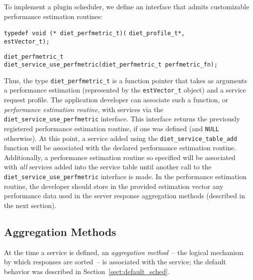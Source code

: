 To implement a plugin scheduler, we define an interface that admits
customizable performance estimation routines:
\begin{tabbing}
  \texttt{typedef void (* diet\_perfmetric\_t)(}
    \=\texttt{diet\_profile\_t*,} \\
    \>\texttt{estVector\_t);} \\
\end{tabbing}
\begin{tabbing}
  \texttt{diet\_perfmetric\_t} \\
  \texttt{diet\_service\_use\_perfmetric(diet\_perfmetric\_t perfmetric\_fn);}\\
\end{tabbing}
Thus, the type \texttt{diet\_perfmetric\_t} is a function pointer that takes as
arguments a performance estimation (represented by the \texttt{estVector\_t}
object) and a \diet service request profile.  The application developer can
associate such a function, or \emph{performance estimation routine}, with \diet
services via the \texttt{diet\_service\_use\_perfmetric} interface.  This
interface returns the previously registered performance estimation routine, if
one was defined (and \texttt{NULL} otherwise).  At this point, a service added
using the \texttt{diet\_service\_table\_add} function will be associated with
the declared performance estimation routine.  Additionally, a performance
estimation routine so specified will be associated with \emph{all} services
added into the service table until another call to the
\texttt{diet\_service\_use\_perfmetric} interface is made.  In the performance
estimation routine, the {\sed} developer should store in the provided
estimation vector any performance data used in the server response aggregation
methods (described in the next section).

\subsection{Aggregation Methods}\label{sect:agg_methods}

At the time a \diet service is defined, an \emph{aggregation method}~-- the
logical mechanism by which {\sed} responses are sorted~-- is associated with
the service; the default behavior was described in
Section~\ref{sect:default_sched}.

